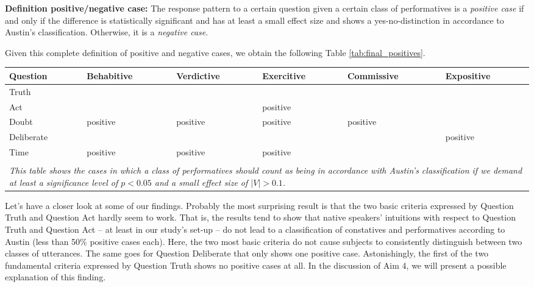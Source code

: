 \documentclass[egregdoesnotlikesansseriftitles,12pt]{scrartcl}
\begin{document}
\begin{addmargin}[11pt]{0pt}
   \textbf{Definition positive/negative case:} The response pattern to a certain question given a certain class of performatives is a \textit{positive case} if and only if the difference is statistically significant and has at least a small effect size and shows a yes-no-distinction in accordance to Austin's classification. Otherwise, it is a \textit{negative case}.\\
\end{addmargin}

\noindent Given this complete definition of positive and negative cases, we obtain the following Table \ref{tab:final_positives}.

\begin{table}[ht]
\begin{tabular}{llllll}
\hline
Question   & Behabitive & Verdictive & Exercitive & Commissive & Expositive \\
\hline\hline
Truth      &            &            &            &            &            \\
Act        &            &            & positive   &            &            \\
Doubt      & positive   & positive   & positive   & positive   &            \\
Deliberate &            &            &            &            & positive   \\
Time       & positive   & positive   & positive   &            &            \\
\hline\\[-1.5ex]
\multicolumn{6}{p{13.5cm}}{\footnotesize\textit{This table shows the cases in which a class of performatives should count as being in accordance with Austin's classification if we demand at least a significance level of $p<0.05$ and a small effect size of $|V|>0.1$.}}
\caption{Final classification of positive cases}\label{tab:final_positives}
\end{tabular}
\end{table}

\noindent Let's have a closer look at some of our findings. Probably the most surprising result is that the two basic criteria expressed by Question Truth and Question Act hardly seem to work. That is, the results tend to show that native speakers' intuitions with respect to Question Truth and Question Act -- at least in our study's set-up -- do not lead to a classification of constatives and performatives according to Austin (less than 50\% positive cases each). Here, the two most basic criteria do not cause subjects to consistently distinguish between two classes of utterances. The same goes for Question Deliberate that only shows one positive case. Astonishingly, the first of the two fundamental criteria expressed by Question Truth shows no positive cases at all. In the discussion of Aim 4, we will present a possible explanation of this finding.
\end{document}
